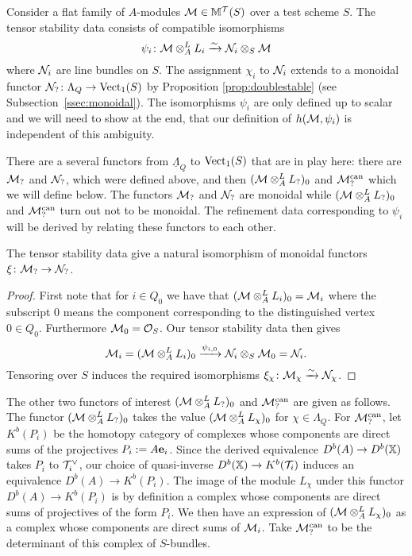 \documentclass[12pt]{amsart}
\begin{document}
Consider a flat family of $A$-modules $\mathcal{M} \in \mathbb{M}^{\mathcal{T}}(S)$ over a test scheme $S$.
The tensor stability data consists of compatible isomorphisms 
$$\psi_i \colon \mathcal{M} \otimes_A^L L_i \xrightarrow{\sim} \mathcal{N}_i \otimes_S \mathcal{M}$$
where $\mathcal{N}_i$ are line bundles on $S$. The assignment $\chi_i$ to $\mathcal{N}_i$ extends to a monoidal functor $\mathcal{N}_? \colon \Lambda_Q \rightarrow \operatorname{Vect}_1(S)$ by Proposition \ref{prop:doublestable} (see Subsection~\ref{ssec:monoidal}). The isomorphisms $\psi_i$ are only defined up to scalar and we will need to show at the end, that our definition of $h(\mathcal{M},\psi_i)$ is independent of this ambiguity.

There are a several functors from $\underline{\Lambda}_{Q}$ to $\operatorname{Vect}_1(S)$ that are in play here: there are $\mathcal{M}_?$ and $\mathcal{N}_?$, which were defined above, and then $(\mathcal{M} \otimes_A^L L_?)_0$ and $\mathcal{M}_?^{\text{can}}$ which we will define below.
The functors $\mathcal{M}_?$ and $\mathcal{N}_?$ are monoidal while $(\mathcal{M} \otimes_A^L L_?)_0$ and $\mathcal{M}_?^{\text{can}}$ turn out not to be monoidal.
The refinement data corresponding to $\psi_i$ will be derived by relating these functors to each other.

\begin{lemma}\label{lm:equivNM}
The tensor stability data give a natural isomorphism of monoidal functors  $\xi \colon \mathcal{M}_? \rightarrow \mathcal{N}_?$.
\end{lemma}

\begin{proof}
First note that for $i\in Q_0$ we have that $(\mathcal{M} \otimes_A^L L_i)_0 = \mathcal{M}_i$ where the subscript 0 means the component corresponding to the distinguished vertex $0\in Q_0$. Furthermore $\mathcal{M}_0 = \mathcal{O}_S$. Our tensor stability data then gives
$$\mathcal{M}_i = (\mathcal{M} \otimes_A^L L_i)_0 \xrightarrow{\psi_{i,0}} \mathcal{N}_i \otimes_S \mathcal{M}_0 = \mathcal{N}_i.$$
Tensoring over $S$ induces the required isomorphisms $\xi_\chi \colon \mathcal{M}_\chi \xrightarrow{\sim} \mathcal{N}_\chi$.
\end{proof}

The other two functors of interest $(\mathcal{M} \otimes_A^L L_?)_0$ and $\mathcal{M}_?^{\text{can}}$ are given as follows.
The functor $(\mathcal{M} \otimes_A^L L_?)_0$ takes the value  $(\mathcal{M} \otimes_A^L L_\chi)_0$ for $\chi \in \Lambda_Q$.
For $\mathcal{M}_?^{\text{can}}$, let $K^b(P_i)$ be the homotopy category of complexes whose components are direct sums of the projectives $P_i := A\mathbf{e}_i$. Since the derived equivalence $D^b(A) \rightarrow D^b(\mathbb{X})$ takes $P_i$ to $\mathcal{T}_i^\vee$, our choice of quasi-inverse $D^b(\mathbb{X}) \rightarrow K^b(\mathcal{T}_i)$ induces an equivalence $D^b(A) \rightarrow K^b(P_i)$. 
The image of the module $L_\chi$ under this functor $D^b(A) \rightarrow K^b(P_i)$ is by definition a complex whose components are direct sums of projectives of the form $P_i$.
We then have an expression of $(\mathcal{M} \otimes_A^L L_\chi)_0$ as a complex whose components are direct sums of $\mathcal{M}_i$.
Take $\mathcal{M}_?^{\text{can}}$ to be the determinant of this complex of $S$-bundles.
\end{document}
